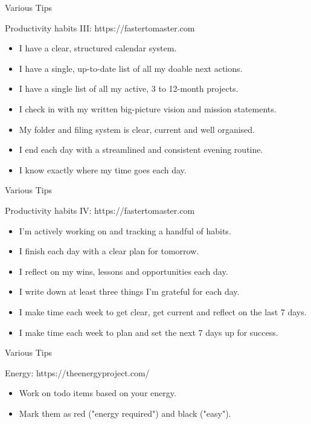 \begin{frame}{Various Tips}
  \begin{block}{Productivity habits III: https://fastertomaster.com}
    \begin{itemize}
      \item I have a clear, structured calendar system.
      \item I have a single, up-to-date list of all my doable next actions.
      \item I have a single list of all my active, 3 to 12-month projects.
      \item I check in with my written big-picture vision and mission statements.
      \item My folder and filing system is clear, current and well organised.
      \item I end each day with a streamlined and consistent evening routine.
      \item I know exactly where my time goes each day.
    \end{itemize}
  \end{block}
\end{frame}

\begin{frame}{Various Tips}
  \begin{block}{Productivity habits IV: https://fastertomaster.com}
    \begin{itemize}
      \item I'm actively working on and tracking a handful of habits.
      \item I finish each day with a clear plan for tomorrow. 
      \item I reflect on my wins, lessons and opportunities each day.
      \item I write down at least three things I’m grateful for each day.
      \item I make time each week to get clear, get current and reflect on the last 7 days.
      \item I make time each week to plan and set the next 7 days up for success.
    \end{itemize}
  \end{block}
\end{frame}

\begin{frame}{Various Tips}
  \begin{block}{Energy: https://theenergyproject.com/}
    \begin{itemize}
      \item Work on todo items based on your energy.
      \item Mark them as red ("energy required") and black ("easy").
    \end{itemize}
  \end{block}
\end{frame}


